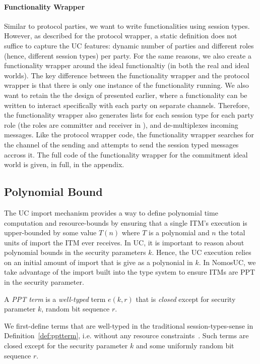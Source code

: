 \paragraph{Functionality Wrapper}
Similar to protocol parties, we want to write functionalities using session types.
However, as described for the protocol wrapper, a static definition does not suffice to capture the UC features: dynamic number of parties and different roles (hence, different session types) per party.
For the same reasons, we also create a functionality wrapper around the ideal functionaltiy (in both the real and ideal worlds).
The key difference between the functionality wrapper and the protocol wrapper is that there is only one instance of the functionality running.
We also want to retain the the design of \Fcom presented earlier, where a functionality can be written to interact specifically with each party on separate channels. 
Therefore, the functionality wrapper also generates lists for each session type for each party role (the roles are committer and receiver in \Fcom), and de-multiplexes incoming messages.
Like the protocol wrapper code, the functionality wrapper searches for the channel of the sending  and attempts to send the session typed messages accross it.
The full code of the functionality wrapper for the commitment ideal world is given, in full, in the appendix. 

\subsection{Polynomial Bound}
The UC import mechanism provides a way to define polynomial time computation and resource-bounds by ensuring that a single ITM's execution is upper-bounded by some value $T(n)$ where $T$ is a polynomial and $n$ the total units of import the ITM ever receives.
In UC, it is important to reason about polynomial bounds in the security parameters $k$. Hence, the UC execution relies on an initial amount of import that is give as a polynonial in $k$. 
In NomosUC, we take advantage of the import built into the type system to ensure ITMs are PPT in the security parameter. 

\begin{definition}\label{def:pptterm}
A \textit{PPT term} is a \textit{well-typed} term $e(k, r)$ that is \textit{closed} except for security parameter $k$, random bit sequence $r$.
\end{definition}

We first-define terms that are well-typed in the traditional session-types-sense in Definition~\ref{def:pptterm}, i.e. without any resource constraints~\cite{sessiontypes}.
Such terms are closed except for the security parameter $k$ and some uniformly random bit sequence $r$.

